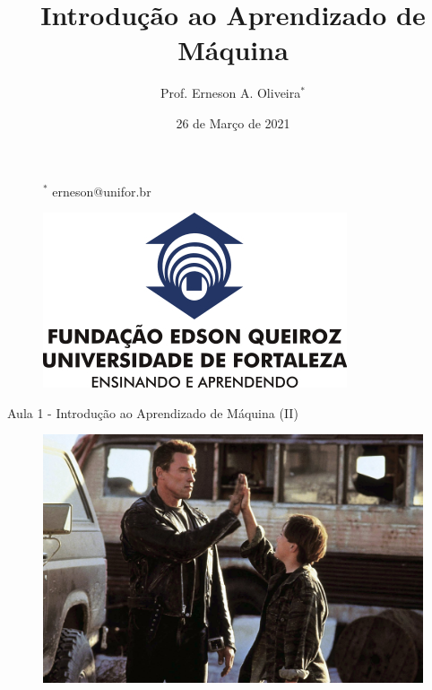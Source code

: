 \documentclass[12pt,mathserif,aspectratio=169]{beamer}
\title[Introdução ao Aprendizado de Máquina]{Introdução ao Aprendizado de Máquina}
\author[Prof. Erneson A. Oliveira]{Prof. Erneson A. Oliveira$^*$}
\institute[MBACD-UNIFOR]{MBA em Ciência de Dados\\Universidade de Fortaleza}
\date{26 de Março de 2021}
\begin{document}
\begin{frame}
    \vspace{1.0cm}
    \titlepage
    \vspace{-1.5cm}
    
    \begin{figure}
        \begin{minipage}{0.4\paperwidth}
            \vspace{1.75cm}
            \begin{flushleft}
                {\tiny $^*$ erneson@unifor.br}
            \end{flushleft}
        \end{minipage}
        \hfill
        \begin{minipage}{0.4\paperwidth}
            \vspace{-0.5cm}
            \begin{flushright}
                \includegraphics[width=0.2\paperwidth]{fig/UNIFOR.jpg}
            \end{flushright}
        \end{minipage}
    \end{figure}
\end{frame}

\begin{frame}
	\Large Aula 1 - Introdução ao Aprendizado de Máquina (II)
	\begin{figure}
		\includegraphics[width=0.7\paperwidth]{fig/terminator2.jpg}
	\end{figure}
\end{frame}
\end{document}
